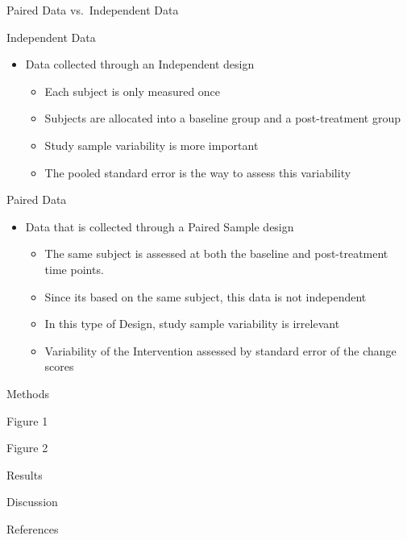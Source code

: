 \documentclass[
  ignorenonframetext,
  aspectratio=169,
]{beamer}
\providecommand{\tightlist}{%
  \setlength{\itemsep}{0pt}\setlength{\parskip}{0pt}}
\begin{document}
\begin{frame}{Paired Data vs.~Independent Data}
\protect\hypertarget{paired-data-vs.-independent-data}{}
\begin{block}{Independent Data}
\protect\hypertarget{independent-data}{}
\begin{itemize}
\tightlist
\item
  Data collected through an Independent design

  \begin{itemize}
  \tightlist
  \item
    Each subject is only measured once
  \item
    Subjects are allocated into a baseline group and a post-treatment
    group
  \item
    Study sample variability is more important
  \item
    The pooled standard error is the way to assess this variability
  \end{itemize}
\end{itemize}
\end{block}

\begin{block}{Paired Data}
\protect\hypertarget{paired-data}{}
\begin{itemize}
\tightlist
\item
  Data that is collected through a Paired Sample design

  \begin{itemize}
  \tightlist
  \item
    The same subject is assessed at both the baseline and post-treatment
    time points.
  \item
    Since its based on the same subject, this data is not independent
  \item
    In this type of Design, study sample variability is irrelevant
  \item
    Variability of the Intervention assessed by standard error of the
    change scores
  \end{itemize}
\end{itemize}
\end{block}
\end{frame}

\begin{frame}{Methods}
\protect\hypertarget{methods}{}
\end{frame}

\begin{frame}{Figure 1}
\protect\hypertarget{figure-1}{}
\end{frame}

\begin{frame}{Figure 2}
\protect\hypertarget{figure-2}{}
\end{frame}

\begin{frame}{Results}
\protect\hypertarget{results}{}
\end{frame}

\begin{frame}{Discussion}
\protect\hypertarget{discussion}{}
\end{frame}

\begin{frame}{References}
\protect\hypertarget{references}{}
\end{frame}
\end{document}
